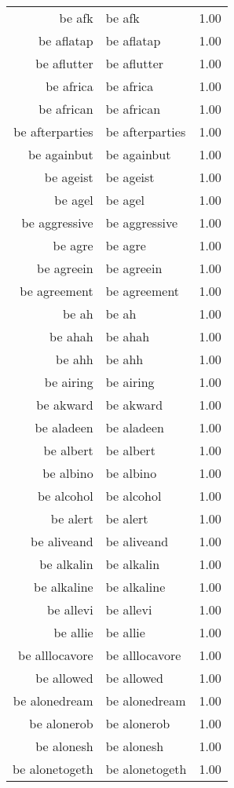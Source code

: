 \begin{table}[ht]
\begin{tabular}{rlr}
  be afk & be afk & 1.00 \\ 
  be aflatap & be aflatap & 1.00 \\ 
  be aflutter & be aflutter & 1.00 \\ 
  be africa & be africa & 1.00 \\ 
  be african & be african & 1.00 \\ 
  be afterparties & be afterparties & 1.00 \\ 
  be againbut & be againbut & 1.00 \\ 
  be ageist & be ageist & 1.00 \\ 
  be agel & be agel & 1.00 \\ 
  be aggressive & be aggressive & 1.00 \\ 
  be agre & be agre & 1.00 \\ 
  be agreein & be agreein & 1.00 \\ 
  be agreement & be agreement & 1.00 \\ 
  be ah & be ah & 1.00 \\ 
  be ahah & be ahah & 1.00 \\ 
  be ahh & be ahh & 1.00 \\ 
  be airing & be airing & 1.00 \\ 
  be akward & be akward & 1.00 \\ 
  be aladeen & be aladeen & 1.00 \\ 
  be albert & be albert & 1.00 \\ 
  be albino & be albino & 1.00 \\ 
  be alcohol & be alcohol & 1.00 \\ 
  be alert & be alert & 1.00 \\ 
  be aliveand & be aliveand & 1.00 \\ 
  be alkalin & be alkalin & 1.00 \\ 
  be alkaline & be alkaline & 1.00 \\ 
  be allevi & be allevi & 1.00 \\ 
  be allie & be allie & 1.00 \\ 
  be alllocavore & be alllocavore & 1.00 \\ 
  be allowed & be allowed & 1.00 \\ 
  be alonedream & be alonedream & 1.00 \\ 
  be alonerob & be alonerob & 1.00 \\ 
  be alonesh & be alonesh & 1.00 \\ 
  be alonetogeth & be alonetogeth & 1.00 \\ 

\end{tabular}
\end{table}
